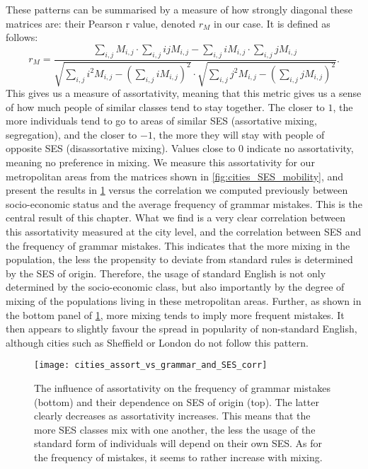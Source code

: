 \documentclass[../thesis.tex]{subfiles}
\begin{document}
These patterns can be summarised by a measure of how strongly diagonal these matrices
are: their Pearson r value, denoted $r_M$ in our case. It is defined as follows:
\begin{equation}
  \label{eq:def_mobility_r}
  r_M = \frac{
      \sum_{i, j} M_{i, j} \cdot \sum_{i, j} i j M_{i, j}
      - \sum_{i, j} i M_{i, j} \cdot \sum_{i, j} j M_{i, j}
    }{
      \sqrt{\sum_{i, j} i^2 M_{i, j} - \left( \sum_{i, j} i M_{i, j} \right)^2}
      \cdot \sqrt{\sum_{i, j} j^2 M_{i, j} - \left( \sum_{i, j} j M_{i, j} \right)^2}
    }.
\end{equation}
This gives us a measure of assortativity, meaning that this metric gives us a sense of
how much people of similar classes tend to stay together. The closer to $1$, the more
individuals tend to go to areas of similar \ac{SES} (assortative mixing, segregation),
and the closer to $-1$, the more they will stay with people of opposite \ac{SES}
(disassortative mixing). Values close to $0$ indicate no assortativity, meaning no
preference in mixing. We measure this assortativity for our metropolitan areas from the
matrices shown in \cref{fig:cities_SES_mobility}, and present the results in
\cref{fig:cities_assort_vs_grammar_and_SES_corr} versus the correlation we computed
previously between socio-economic status and the average frequency of grammar mistakes.
This is the central result of this chapter. What we find is a very clear correlation
between this assortativity measured at the city level, and the correlation between
\ac{SES} and the frequency of grammar mistakes. This indicates that the more mixing in
the population, the less the propensity to deviate from standard rules is determined by
the \ac{SES} of origin. Therefore, the usage of standard English is not only determined
by the socio-economic class, but also importantly by the degree of mixing of the
populations living in these metropolitan areas. Further, as shown in the bottom panel of
\cref{fig:cities_assort_vs_grammar_and_SES_corr}, more mixing tends to imply more
frequent mistakes. It then appears to slightly favour the spread in popularity of
non-standard English, although cities such as Sheffield or London do not follow this
pattern.
\begin{figure}
\centering
  \texttt{[image: cities\_assort\_vs\_grammar\_and\_SES\_corr]}
  \caption{The influence of assortativity on the frequency of grammar mistakes (bottom)
  and their dependence on \ac{SES} of origin (top). The latter clearly decreases as
  assortativity increases. This means that the more \ac{SES} classes mix with one
  another, the less the usage of the standard form of individuals will depend on their
  own \ac{SES}. As for the frequency of mistakes, it seems to rather increase with
  mixing.}
  \label{fig:cities_assort_vs_grammar_and_SES_corr}
\end{figure}
\end{document}
